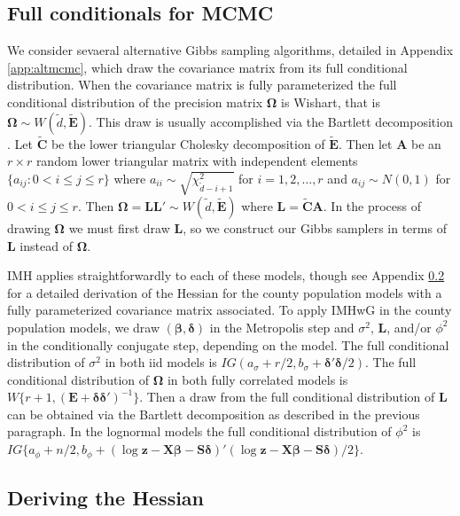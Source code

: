 \documentclass[12pt]{article}
\begin{document}
\subsection{Full conditionals for MCMC}
We consider sevaeral alternative Gibbs sampling algorithms, detailed in Appendix \ref{app:altmcmc}, which draw the covariance matrix from its full conditional distribution. When the covariance matrix is fully parameterized the full conditional distribution of the precision matrix $\bm{\Omega}$ is Wishart, that is $\bm{\Omega} \sim W(\widetilde{d}, \widetilde{\bm{E}})$. This draw is usually accomplished via the Bartlett decomposition \citep{smith1972algorithm}. Let $\widetilde{\bm{C}}$ be the lower triangular Cholesky decomposition of $\widetilde{\bm{E}}$. Then let $\bm{A}$ be an $r\times r$ random lower triangular matrix with independent elements $\{a_{ij}:0<i\le j\le r\}$ where $a_{ii} \sim \sqrt{\chi^2_{\widetilde{d} - i + 1}}$ for $i=1,2,\dots,r$ and $a_{ij} \sim N(0,1)$ for $0<i\le j\le r$. Then $\bm{\Omega} = \bm{L}\bm{L}' \sim W(\widetilde{d}, \widetilde{\bm{E}})$ where $\bm{L} = \widetilde{\bm{C}}\bm{A}$. In the process of drawing $\bm{\Omega}$ we must first draw $\bm{L}$, so we construct our Gibbs samplers in terms of $\bm{L}$ instead of $\bm{\Omega}$.

IMH applies straightforwardly to each of these models, though see Appendix \ref{subapp:hess} for a detailed derivation of the Hessian for the county population models with a fully parameterized covariance matrix associated. To apply IMHwG in the county population models, we draw $(\bm{\beta},\bm{\delta})$ in the Metropolis step and $\sigma^2$, $\bm{L}$, and/or $\phi^2$ in the conditionally conjugate step, depending on the model. The full conditional distribution of $\sigma^2$ in both iid models is $IG(a_{\sigma} + r/2, b_{\sigma} + \bm{\delta}'\bm{\delta}/2)$. The full conditional distribution of $\bm{\Omega}$ in both fully correlated models is $W\{r + 1, (\bm{E} + \bm{\delta}\bm{\delta}')^{-1}\}$. Then a draw from the full conditional distribution of $\bm{L}$ can be obtained via the Bartlett decomposition as described in the previous paragraph. In the lognormal models the full conditional distribution of $\phi^2$ is $IG\{a_{\phi} + n/2, b_{\phi} + (\log \bm{z} - \bm{X}\bm{\beta} - \bm{S}\bm{\delta})'(\log \bm{z} - \bm{X}\bm{\beta} - \bm{S}\bm{\delta})/2\}$. 

\subsection{Deriving the Hessian}\label{subapp:hess}
\end{document}
